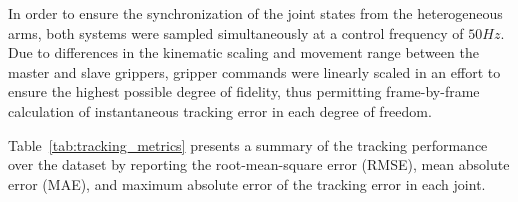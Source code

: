 \documentclass[a4paper, 10pt, conference]{ieeeconf}      %
\begin{document}
In order to ensure the synchronization of the joint states from the heterogeneous arms, both systems were sampled simultaneously at a control frequency of $50Hz$. Due to differences in the kinematic scaling and movement range between the master and slave grippers, gripper commands were linearly scaled in an effort to ensure the highest possible degree of fidelity, thus permitting frame-by-frame calculation of instantaneous tracking error in each degree of freedom.

Table~\ref{tab:tracking_metrics} presents a summary of the tracking performance over the dataset by reporting the root-mean-square error (RMSE), mean absolute error (MAE), and maximum absolute error of the tracking error in each joint.

\begin{table}[th]
\centering
\caption{Joint Tracking Performance Metrics}
\label{tab:tracking_metrics}
\end{table}
\end{document}

